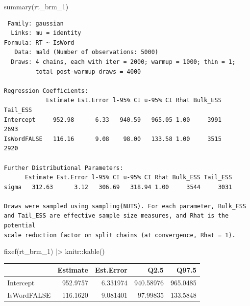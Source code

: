 \documentclass[
  letterpaper,
  DIV=11,
  numbers=noendperiod]{scrartcl}
\newenvironment{Shaded}{\begin{snugshade}}{\end{snugshade}}
\newcommand{\FunctionTok}[1]{\textcolor[rgb]{0.28,0.35,0.67}{#1}}
\newcommand{\NormalTok}[1]{\textcolor[rgb]{0.00,0.23,0.31}{#1}}
\newcommand{\SpecialCharTok}[1]{\textcolor[rgb]{0.37,0.37,0.37}{#1}}
\newcounter{none} %
\begin{document}
\begin{Shaded}
\begin{Highlighting}[]
\FunctionTok{summary}\NormalTok{(rt\_brm\_1)}
\end{Highlighting}
\end{Shaded}

\begin{verbatim}
 Family: gaussian 
  Links: mu = identity 
Formula: RT ~ IsWord 
   Data: mald (Number of observations: 5000) 
  Draws: 4 chains, each with iter = 2000; warmup = 1000; thin = 1;
         total post-warmup draws = 4000

Regression Coefficients:
            Estimate Est.Error l-95% CI u-95% CI Rhat Bulk_ESS Tail_ESS
Intercept     952.98      6.33   940.59   965.05 1.00     3991     2693
IsWordFALSE   116.16      9.08    98.00   133.58 1.00     3515     2920

Further Distributional Parameters:
      Estimate Est.Error l-95% CI u-95% CI Rhat Bulk_ESS Tail_ESS
sigma   312.63      3.12   306.69   318.94 1.00     3544     3031

Draws were sampled using sampling(NUTS). For each parameter, Bulk_ESS
and Tail_ESS are effective sample size measures, and Rhat is the potential
scale reduction factor on split chains (at convergence, Rhat = 1).
\end{verbatim}

\begin{Shaded}
\begin{Highlighting}[]
\FunctionTok{fixef}\NormalTok{(rt\_brm\_1) }\SpecialCharTok{|\textgreater{}} 
\NormalTok{  knitr}\SpecialCharTok{::}\FunctionTok{kable}\NormalTok{()}
\end{Highlighting}
\end{Shaded}

{\def\LTcaptype{none} %
\begin{longtable}[]{@{}lrrrr@{}}
\toprule\noalign{}
& Estimate & Est.Error & Q2.5 & Q97.5 \\
\midrule\noalign{}
\endhead
\bottomrule\noalign{}
\endlastfoot
Intercept & 952.9757 & 6.331974 & 940.58976 & 965.0485 \\
IsWordFALSE & 116.1620 & 9.081401 & 97.99835 & 133.5848 \\
\end{longtable}
}
\end{document}
